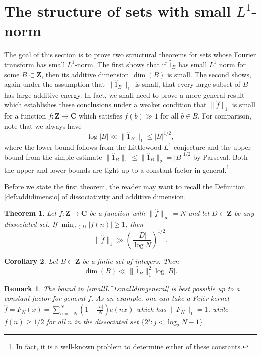 \documentclass[11pt, reqno]{amsart}
\newtheorem{theorem}{Theorem}[section]
\newtheorem{cor}[theorem]{Corollary}
\newtheorem*{rmk*}{Remark}
\begin{document}
\section{The structure of sets with small $L^1$-norm}
The goal of this section is to prove two structural theorems for sets whose Fourier transform has small $L^1$-norm. The first shows that if $\hat{1}_B$ has small $L^1$ norm for some $B\subset \mathbf{Z}$, then its additive dimension $\dim(B)$ is small. The second shows, again under the assumption that $\lVert \hat{1}_B\rVert_1$ is small, that every large subset of $B$ has large additive energy. In fact, we shall need to prove a more general result which establishes these conclusions under a weaker condition that $\lVert \hat{f} \rVert_1$ is small for a function $f:\mathbf{Z}\to\mathbf{C}$ which satisfies $f(b)\gg 1$ for all $b\in B$. For comparison, note that we always have
$$\log |B|\ll \lVert \hat{1}_B\rVert_1\leqslant |B|^{1/2},$$
where the lower bound follows from the Littlewood $L^1$ conjecture and the upper bound from the simple estimate $\lVert \hat{1}_B\rVert_1\leqslant \lVert \hat{1}_B\rVert_2=|B|^{1/2}$ by Parseval. Both the upper and lower bounds are tight up to a constant factor in general.\footnote{In fact, it is a well-known problem to determine either of these constants.}

\medskip

Before we state the first theorem, the reader may want to recall the Definition \ref{def:addidimensio} of dissociativity and additive dimension.

\begin{theorem}\label{th:smallL^1smalldim}
    Let $f:\mathbf{Z}\to\mathbf{C}$ be a function with $\lVert \hat{f}\rVert_\infty=N$ and let $D\subset \mathbf{Z}$ be any dissociated set. If $\min_{n\in D}|f(n)|\geqslant 1$, then
    \begin{equation}\label{smallL^1smalldimgeneral}
       \lVert \hat{f}\rVert_1\gg \left(\frac{|D|}{\log N}\right)^{1/2}. 
    \end{equation}
\end{theorem}
\begin{cor}\label{cor:smalldim}
    Let $B\subset\mathbf{Z}$ be a finite set of integers. Then
    \begin{equation}\label{smallL^1smalldim}
       \dim(B)\ll \lVert \hat{1}_B\rVert_1^{2} \log |B|. 
    \end{equation}
\end{cor}
\begin{rmk*}
   The bound in \eqref{smallL^1smalldimgeneral} is best possible up to a constant factor for general $f$. As an example, one can take a Fej\'er kernel $\hat{f}=F_N(x)=\sum_{n=-N}^N\left(1-\frac{|n|}{N}\right)e(nx)$ which has $\lVert F_N\rVert_1=1$, while $f(n)\geqslant 1/2$ for all $n$ in the dissociated set $\{2^j:j<\log_2 N-1\}$.
\end{rmk*}
\end{document}

